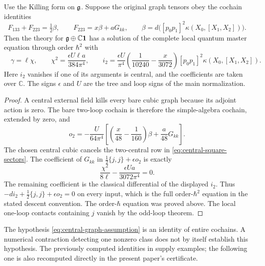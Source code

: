 \begin{theorem}
\label{thm:central-cancellation}
Use the Killing form on $\mathfrak g$.  Suppose the original graph tensors obey
the cochain identities
\begin{equation}
 F_{133}+F_{223}=\tfrac12\beta,\qquad
 F_{223}=x\beta+aG_{kk},\qquad
 \beta=d\bigl([p_0p_1]^2\kappa(X_0,[X_1,X_2])\bigr).
 \label{eq:central-graph-assumption}
\end{equation}
Then the theory for $\mathfrak g\oplus\mathbb C\mathbf1$ has a solution of the
complete local quantum master equation through order $\hbar^2$ with
\begin{equation}
 \boxed{\quad
 \gamma=\ell\chi,\qquad
 \chi^2=\frac{\epsilon U\ell a}{384\pi^4},\qquad
 i_2=\frac{\epsilon U}{\pi^4}
       \left(\frac1{10240}-\frac{x}{3072}\right)
       [p_0p_1]^2\kappa(X_0,[X_1,X_2]).\quad}
 \label{eq:central-solution}
\end{equation}
Here $i_2$ vanishes if one of its arguments is central, and the
coefficients are taken over $\mathbb C$.  The signs $\epsilon$ and $U$
are the tree and loop signs of the main normalization.
\end{theorem}

\begin{proof}
A central external field kills every bare cubic graph because its
adjoint action is zero.  The bare two-loop cochain is therefore the
simple-algebra cochain, extended by zero, and
\begin{equation}
 o_2=-\frac{U}{64\pi^4}
       \left[\left(\frac{x}{48}-\frac1{160}\right)\beta
                  +\frac{a}{48}G_{kk}\right].
 \label{eq:central-bare-anomaly}
\end{equation}
The chosen central cubic cancels the two-central row in
\eqref{eq:central-square-sectors}.  The coefficient of $G_{kk}$ in
$\tfrac12\{j,j\}+\epsilon o_2$ is exactly
\begin{equation}
 \frac{\chi^2}{8\ell}-\frac{\epsilon U a}{3072\pi^4}=0.
\end{equation}
The remaining coefficient is the classical differential of the
displayed $i_2$.  Thus
$-di_2+\tfrac12\{j,j\}+\epsilon o_2=0$ on every input, which is the
full order-$\hbar^2$ equation in the stated descent convention.
The order-$\hbar$ equation was proved above.  The local one-loop
contacts containing $j$ vanish by the odd-loop theorem.
\end{proof}

The hypothesis \eqref{eq:central-graph-assumption} is an identity of
entire cochains.  A numerical contraction detecting one nonzero class
does not by itself establish this hypothesis.  The previously computed
identities in \cite{RepoOriginal} supply examples; the following one is
also recomputed directly in the present paper's certificate.

